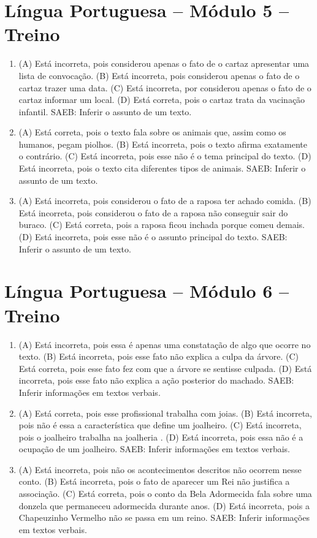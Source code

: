 \section*{Língua Portuguesa – Módulo 5 – Treino}

\begin{enumerate}
\item
(A) Está incorreta, pois considerou apenas o fato de o cartaz apresentar uma lista de convocação.
(B) Está incorreta, pois considerou apenas o fato de o cartaz trazer uma data.
(C) Está incorreta, por considerou apenas o fato de o cartaz informar um local.
(D) Está correta, pois o cartaz trata da vacinação infantil.
SAEB: Inferir o assunto de um texto.

\item
(A) Está correta, pois o texto fala sobre os animais que, assim como os humanos, pegam piolhos.
(B) Está incorreta, pois o texto afirma exatamente o contrário.
(C) Está incorreta, pois esse não é o tema principal do texto.
(D) Está incorreta, pois o texto cita diferentes tipos de animais.
SAEB: Inferir o assunto de um texto.

\item
(A) Está incorreta, pois considerou o fato de a raposa ter achado comida.
(B) Está incorreta, pois considerou o fato de a raposa não conseguir
sair do buraco.
(C) Está correta, pois a raposa ficou inchada porque comeu demais.
(D) Está incorreta, pois esse não é o assunto principal do texto.
SAEB: Inferir o assunto de um texto.
\end{enumerate}

\section*{Língua Portuguesa – Módulo 6 – Treino}

\begin{enumerate}
\item
(A) Está incorreta, pois essa é apenas uma constatação de algo que ocorre no texto.
(B) Está incorreta, pois esse fato não explica a culpa da árvore.
(C) Está correta, pois esse fato fez com que a árvore se sentisse culpada.
(D) Está incorreta, pois esse fato não explica a ação posterior do machado.
SAEB: Inferir informações em textos verbais.

\item
(A) Está correta, pois esse profissional trabalha com joias.
(B) Está incorreta, pois não é essa a característica que define um joalheiro.
(C) Está incorreta, pois o joalheiro trabalha na joalheria .
(D) Está incorreta, pois essa não é a ocupação de um joalheiro.
SAEB: Inferir informações em textos verbais.

\item
(A) Está incorreta, pois não os acontecimentos descritos não ocorrem nesse conto.
(B) Está incorreta, pois o fato de aparecer um Rei não justifica a associação.
(C) Está correta, pois o conto da Bela Adormecida fala sobre uma donzela que permaneceu adormecida durante anos.
(D) Está incorreta, pois a Chapeuzinho Vermelho não se passa em um reino.
SAEB: Inferir informações em textos verbais.
\end{enumerate}

